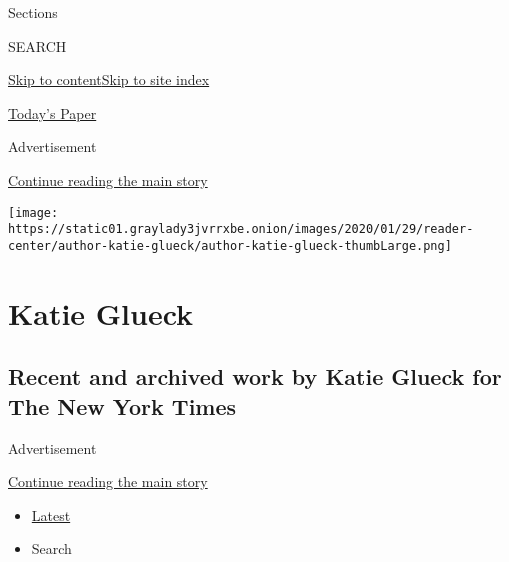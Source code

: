 Sections

SEARCH

\protect\hyperlink{site-content}{Skip to
content}\protect\hyperlink{site-index}{Skip to site index}

\href{https://myaccount.nytimes3xbfgragh.onion/auth/login?response_type=cookie\&client_id=vi}{}

\href{https://www.nytimes3xbfgragh.onion/section/todayspaper}{Today's
Paper}

Advertisement

\protect\hyperlink{after-top}{Continue reading the main story}

\texttt{[image: https://static01.graylady3jvrrxbe.onion/images/2020/01/29/reader-center/author-katie-glueck/author-katie-glueck-thumbLarge.png]}

\hypertarget{katie-glueck}{%
\section{Katie Glueck}\label{katie-glueck}}

\hypertarget{recent-and-archived-work-by-katie-glueck-for-the-new-york-times}{%
\subsection{Recent and archived work by Katie Glueck for The New York
Times}\label{recent-and-archived-work-by-katie-glueck-for-the-new-york-times}}

Advertisement

\protect\hyperlink{after-mid1}{Continue reading the main story}

\begin{itemize}
\tightlist
\item
  \protect\hyperlink{stream-panel}{Latest}
\item
  Search
\end{itemize}

